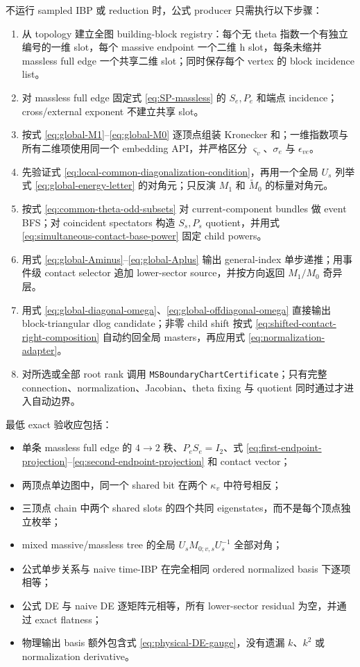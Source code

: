 \documentclass[11pt,a4paper]{ctexart}
\begin{document}
不运行 sampled IBP 或 reduction 时，公式 producer 只需执行以下步骤：
\begin{enumerate}[label=\arabic*.]
  \item 从 topology 建立全图 building-block registry：每个无 theta 指数一个有独立编号的一维 slot，每个 massive endpoint 一个二维 h slot，每条未缩并 massless full edge 一个共享二维 slot；同时保存每个 vertex 的 block incidence list。
  \item 对 massless full edge 固定式 \eqref{eq:SP-massless} 的 $S_e,P_e$ 和端点 incidence；cross/external exponent 不建立共享 slot。
  \item 按式 \eqref{eq:global-M1}--\eqref{eq:global-M0} 逐顶点组装 Kronecker 和；一维指数项与所有二维项使用同一个 embedding API，并严格区分 $\varsigma_v$、$\sigma_e$ 与 $\epsilon_{ve}$。
  \item 先验证式 \eqref{eq:local-common-diagonalization-condition}，再用一个全局 $U_s$ 列举式 \eqref{eq:global-energy-letter} 的对角元；只反演 $M_1$ 和 $\widetilde M_0$ 的标量对角元。
  \item 按式 \eqref{eq:common-theta-odd-subsets} 对 current-component bundles 做 event BFS；对 coincident spectators 构造 $S_s,P_s$ quotient，并用式 \eqref{eq:simultaneous-contact-base-power} 固定 child powers。
  \item 用式 \eqref{eq:global-Aminus}--\eqref{eq:global-Aplus} 输出 general-index 单步递推；用事件级 contact selector 追加 lower-sector source，并按方向返回 $M_1/M_0$ 奇异层。
  \item 用式 \eqref{eq:global-diagonal-omega}、\eqref{eq:global-offdiagonal-omega} 直接输出 block-triangular dlog candidate；非零 child shift 按式 \eqref{eq:shifted-contact-right-composition} 自动约回全局 masters，再应用式 \eqref{eq:normalization-adapter}。
  \item 对所选或全部 root rank 调用 \texttt{MSBoundaryChartCertificate}；只有完整 connection、normalization、Jacobian、theta fixing 与 quotient 同时通过才进入自动边界。
\end{enumerate}

最低 exact 验收应包括：
\begin{itemize}
  \item 单条 massless full edge 的 $4\to2$ 秩、$P_eS_e=I_2$、式 \eqref{eq:first-endpoint-projection}--\eqref{eq:second-endpoint-projection} 和 contact vector；
  \item 两顶点单边图中，同一个 shared bit 在两个 $\kappa_v$ 中符号相反；
  \item 三顶点 chain 中两个 shared slots 的四个共同 eigenstates，而不是每个顶点独立枚举；
  \item mixed massive/massless tree 的全局 $U_sM_{0;v,s}U_s^{-1}$ 全部对角；
  \item 公式单步关系与 naive time-IBP 在完全相同 ordered normalized basis 下逐项相等；
  \item 公式 DE 与 naive DE 逐矩阵元相等，所有 lower-sector residual 为空，并通过 exact flatness；
  \item 物理输出 basis 额外包含式 \eqref{eq:physical-DE-gauge}，没有遗漏 $k$、$k^2$ 或 normalization derivative。
\end{itemize}
\end{document}
